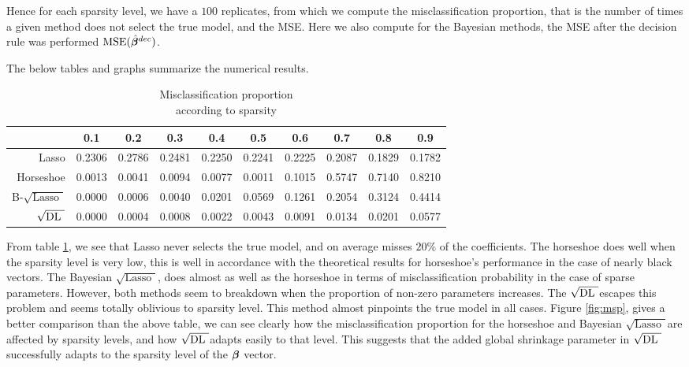 \documentclass[chapters]{uamaththesis}
\def\sql{$\sqrt{\text{Lasso }}$}
\def\sqdl{$\sqrt{\text{\rm{DL} }}$}
\begin{document}
Hence for each sparsity level, we have a $100$ replicates, from which we compute the misclassification proportion, that is the number of times a given method does not select the true model, and the MSE. Here we also compute for the Bayesian methods, the MSE after the decision rule was performed $\textbf{\rm{MSE}}(\hat{\boldsymbol{\beta}}^{dec})$. 

The below tables and graphs summarize the numerical results.


\begin{table}[h!]
\caption{Misclassification proportion \\ according to sparsity}\label{table:msp}
\begin{center}
\begin{tabular}{c|c|c|c|c|c|c|c|c|c|}
\cline{2-10}
    & 0.1  &  0.2  &  0.3  &  0.4  &  0.5 &   0.6  &  0.7  &  0.8 &   0.9 	\\
\hline
\multicolumn{1}{|r|}{Lasso} &  0.2306 & 0.2786 & 0.2481 & 0.2250 & 0.2241 & 0.2225 & 0.2087 & 0.1829 & 0.1782	\\
\hline
\multicolumn{1}{|r|}{Horseshoe} &  0.0013 & 0.0041 & 0.0094 & 0.0077 & 0.0011 & 0.1015 & 0.5747 & 0.7140 & 0.8210\\
\hline
\multicolumn{1}{|r|}{B-\sql} & 0.0000 & 0.0006 & 0.0040 & 0.0201 & 0.0569 & 0.1261 & 0.2054 & 0.3124 & 0.4414 \\
\hline
\multicolumn{1}{|r|}{\sqdl} & 0.0000 & 0.0004 & 0.0008 & 0.0022 & 0.0043 & 0.0091 & 0.0134 & 0.0201 & 0.0577 \\
\hline
\end{tabular}
\end{center}

\end{table}

From table \ref{table:msp}, we see that Lasso never selects the true model, and on average misses $20 \% $ of the coefficients. The horseshoe does well when the sparsity  level is very low, this is well in accordance with the theoretical results for horseshoe's performance in the case of nearly black vectors. The Bayesian \sql, does almost as well as the horseshoe in terms of misclassification probability in the case of sparse parameters. However, both methods seem to breakdown when the proportion of non-zero parameters increases. The \sqdl escapes this problem and seems totally oblivious to sparsity level. This method almost pinpoints the true model in all cases. Figure \ref{fig:msp}, gives a better comparison than the above table, we can see clearly how the misclassification proportion for the horseshoe and Bayesian \sql are affected by sparsity levels, and how \sqdl adapts easily to that level. This suggests that the added global shrinkage parameter in \sqdl  successfully adapts to the sparsity level of the $\boldsymbol{\beta}$ vector. 
\end{document}
